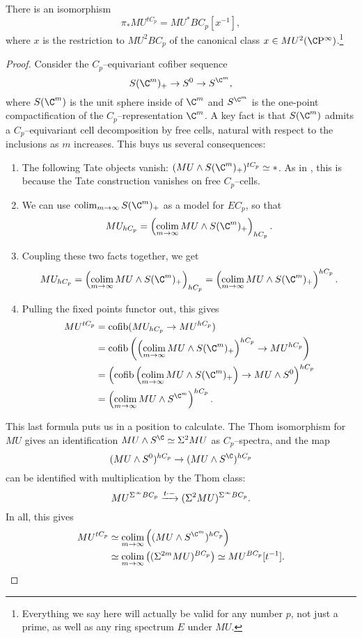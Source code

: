 \begin{theorem}\label{TateConstructionOnMU}
There is an isomorphism \[\pi_* MU^{tC_p} = MU^* BC_p[x^{-1}],\] where \(x\) is the restriction to \(MU^2 BC_p\) of the canonical class \(x \in MU^2(\CP^\infty)\).\footnote{Everything we say here will actually be valid for any number \(p\), not just a prime, as well as any ring spectrum \(E\) under \(MU\).}
\end{theorem}
\begin{proof}
Consider the \(C_p\)--equivariant cofiber sequence \[S(\C^m)_+ \to S^0 \to S^{\C^m},\] where \(S(\C^m)\) is the unit sphere inside of \(\C^m\) and \(S^{\C^m}\) is the one-point compactification of the \(C_p\)--representation \(\C^m\).  A key fact is that \(S(\C^m)\) admits a \(C_p\)--equivariant cell decomposition by free cells, natural with respect to the inclusions as \(m\) increases.  This buys us several consequences:
\begin{enumerate}
    \item The following Tate objects vanish: \((MU \sm S(\C^m)_+)^{tC_p} \simeq *\).  As in , this is because the Tate construction vanishes on free \(C_p\)--cells.
    \item We can use \(\colim_{m \to \infty} S(\C^m)_+\) as a model for \(EC_p\), so that \[MU_{hC_p} = \left( \colim_{m \to \infty} MU \sm S(\C^m)_+ \right)_{hC_p}.\]
    \item Coupling these two facts together, we get \[MU_{hC_p} = \left( \colim_{m \to \infty} MU \sm S(\C^m)_+ \right)_{hC_p} = \left( \colim_{m \to \infty} MU \sm S(\C^m)_+ \right)^{hC_p}.\]
    \item Pulling the fixed points functor out, this gives
    \begin{align*}
    MU^{tC_p} & = \cofib(MU_{hC_p} \to MU^{hC_p}) \\
    & = \cofib\left(\left( \colim_{m \to \infty} MU \sm S(\C^m)_+ \right)^{hC_p} \to MU^{hC_p}\right) \\
    & = \left(\cofib\left( \colim_{m \to \infty} MU \sm S(\C^m)_+ \right) \to MU \sm S^0\right)^{hC_p} \\
    & = \left( \colim_{m \to \infty} MU \sm S^{\C^m} \right)^{hC_p}.
    \end{align*}
\end{enumerate}
This last formula puts us in a position to calculate.  The Thom isomorphism for \(MU\) gives an identification \(MU \sm S^{\C} \simeq \Susp^2 MU\) as \(C_p\)--spectra, and the map \[(MU \sm S^0)^{hC_p} \to (MU \sm S^{\C})^{hC_p}\] can be identified with multiplication by the Thom class: \[MU^{\Sigma^\infty BC_p} \xrightarrow{t \cdot -} (\Sigma^2 MU)^{\Sigma^\infty BC_p}.\]  In all, this gives
\begin{align*}
MU^{tC_p} & \simeq \colim_{m \to \infty} \left((MU \sm S^{\C^m})^{hC_p}\right) \\
& \simeq \colim_{m \to \infty} \left((\Susp^{2m} MU)^{BC_p}\right) \simeq MU^{BC_p}[t^{-1}]. \qedhere
\end{align*}
\end{proof}

